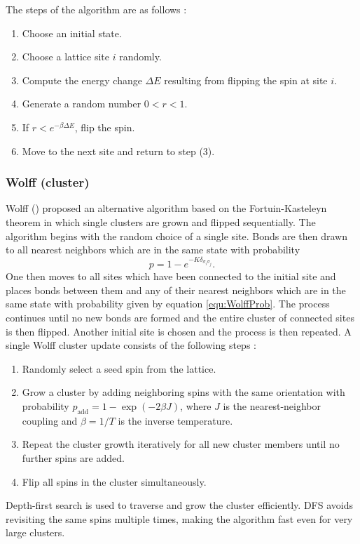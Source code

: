 The steps of the algorithm are as follows \cite{CompAndCrit}:
\begin{enumerate}
  \item Choose an initial state.
  \item Choose a lattice site $i$ randomly.
  \item Compute the energy change $\Delta E$ resulting from flipping the spin at site $i$.
  \item Generate a random number $0 < r < 1$.
  \item If $r < e^{-\beta \Delta E}$, flip the spin.
  \item Move to the next site and return to step (3).
\end{enumerate}


\subsubsection{Wolff (cluster)} \label{section:WolffAlgo}

Wolff (\cite{WolffOGPaper}) proposed an alternative algorithm based on the Fortuin-Kasteleyn theorem in which single clusters are grown and flipped sequentially. The algorithm begins with the random choice of a single site. Bonds are then drawn to all nearest neighbors which are in the same state with probability 
\begin{equation} \label{equ:WolffProb}
    p = 1-e^{-K\delta_{\sigma_i \sigma_j}}.
\end{equation}
One then moves to all sites which have been connected to the initial
site and places bonds between them and any of their nearest neighbors which
are in the same state with probability given by equation \ref{equ:WolffProb}. The process
continues until no new bonds are formed and the entire cluster of connected
sites is then flipped. Another initial site is chosen and the process is then
repeated.
A single Wolff cluster update consists of the following steps \cite{LandauMonteCarlo}:
    \begin{enumerate}
        \item Randomly select a seed spin from the lattice.
        \item Grow a cluster by adding neighboring spins with the same orientation with probability $p_{\text{add}} = 1 - \exp(-2 \beta J)$, where $J$ is the nearest-neighbor coupling and $\beta = 1/T$ is the inverse temperature.
        \item Repeat the cluster growth iteratively for all new cluster members until no further spins are added.
        \item Flip all spins in the cluster simultaneously.
    \end{enumerate}
Depth-first search is used to traverse and grow the cluster efficiently. DFS avoids revisiting the same spins multiple times, making the algorithm fast even for very large clusters.

